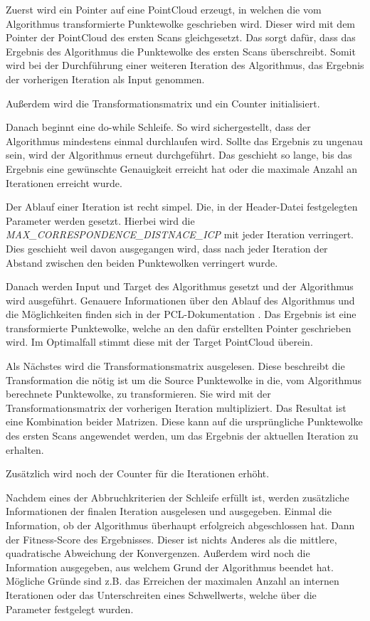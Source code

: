 Zuerst wird ein Pointer auf eine PointCloud erzeugt, in welchen die vom Algorithmus transformierte Punktewolke geschrieben wird.
Dieser wird mit dem Pointer der PointCloud des ersten Scans gleichgesetzt.
Das sorgt dafür, dass das Ergebnis des Algorithmus die Punktewolke des ersten Scans überschreibt.
Somit wird bei der Durchführung einer weiteren Iteration des Algorithmus, das Ergebnis der vorherigen Iteration als Input genommen.

Außerdem wird die Transformationsmatrix und ein Counter initialisiert.

Danach beginnt eine do-while Schleife.
So wird sichergestellt, dass der Algorithmus mindestens einmal durchlaufen wird.
Sollte das Ergebnis zu ungenau sein, wird der Algorithmus erneut durchgeführt.
Das geschieht so lange, bis das Ergebnis eine gewünschte Genauigkeit erreicht hat 
oder die maximale Anzahl an Iterationen erreicht wurde.

Der Ablauf einer Iteration ist recht simpel.
Die, in der Header-Datei festgelegten Parameter werden gesetzt.
Hierbei wird die \textit{MAX\_CORRESPON\-DENCE\_DISTNACE\_ICP} mit jeder Iteration verringert.
Dies geschieht weil davon ausgegangen wird, dass nach jeder Iteration der Abstand zwischen den beiden Punktewolken verringert wurde.

Danach werden Input und Target des Algorithmus gesetzt und der Algorithmus wird ausgeführt.
Genauere Informationen über den Ablauf des Algorithmus und die Möglichkeiten finden sich in der PCL-Dokumentation \cite{pcl2024icp}.
Das Ergebnis ist eine transformierte Punktewolke, welche an den dafür erstellten Pointer geschrieben wird.
Im Optimalfall stimmt diese mit der Target PointCloud überein.

Als Nächstes wird die Transformationsmatrix ausgelesen.
Diese beschreibt die Transformation die nötig ist um die Source Punktewolke in die, 
vom Algorithmus berechnete Punktewolke, zu transformieren.
Sie wird mit der Transformationsmatrix der vorherigen Iteration multipliziert.
Das Resultat ist eine Kombination beider Matrizen.
Diese kann auf die ursprüngliche Punktewolke des ersten Scans angewendet werden, 
um das Ergebnis der aktuellen Iteration zu erhalten.

Zusätzlich wird noch der Counter für die Iterationen erhöht.
\newline

Nachdem eines der Abbruchkriterien der Schleife erfüllt ist, werden zusätzliche Informationen der finalen Iteration ausgelesen und ausgegeben.
Einmal die Information, ob der Algorithmus überhaupt erfolgreich abgeschlossen hat.
Dann der Fitness-Score des Ergebnisses. 
Dieser ist nichts Anderes als die mittlere, quadratische Abweichung der Konvergenzen.
Außerdem wird noch die Information ausgegeben, aus welchem Grund der Algorithmus beendet hat.
Mögliche Gründe sind z.B. das Erreichen der maximalen Anzahl an internen Iterationen
oder das Unterschreiten eines Schwellwerts, welche über die Parameter festgelegt wurden.

